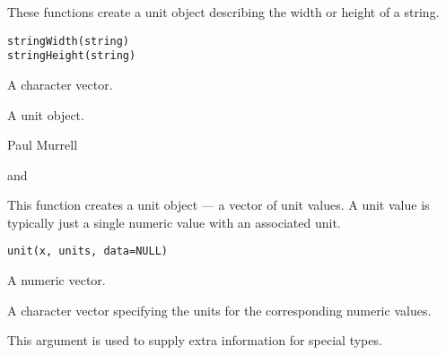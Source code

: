 %
\begin{Description}\relax
These functions create a unit object describing the width or height of
a string.
\end{Description}
%
\begin{Usage}
\begin{verbatim}
stringWidth(string)
stringHeight(string)
\end{verbatim}
\end{Usage}
%
\begin{Arguments}
\begin{ldescription}
\item[\code{string}] A character vector.
\end{ldescription}
\end{Arguments}
%
\begin{Value}
A unit object. 
\end{Value}
%
\begin{Author}\relax
Paul Murrell
\end{Author}
%
\begin{SeeAlso}\relax
{} and
\end{SeeAlso}
%
\begin{Description}\relax
This function creates a unit object --- a vector of unit values.
A unit value is typically just a single numeric value with an
associated unit.
\end{Description}
%
\begin{Usage}
\begin{verbatim}
unit(x, units, data=NULL)
\end{verbatim}
\end{Usage}
%
\begin{Arguments}
\begin{ldescription}
\item[\code{x}] A numeric vector.
\item[\code{units}] A character vector specifying the units for the
corresponding numeric values.
\item[\code{data}] This argument is used to supply extra information
for special  types.
\end{ldescription}
\end{Arguments}
